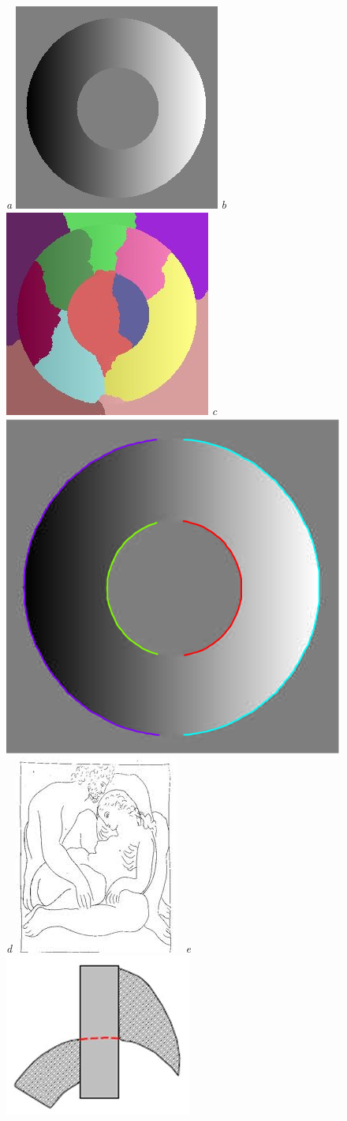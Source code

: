 \begin{figure}[!h]
\centering
{\footnotesize\textit{a}}
\includegraphics[width=0.28\linewidth]{figs/shaded-torus.jpg}
{\footnotesize\textit{b}} \includegraphics[width=0.28\linewidth]{figs/shaded-torus-segmentation.jpg}
{\footnotesize\textit{c}} \includegraphics[width=0.28\linewidth]{figs/torus_contours_multi_color.pdf}
\\
{\footnotesize\textit{d}} \includegraphics[height=0.15\textwidth]{figs/picasso-hands.jpg}
\vbox{
\hbox{
{\footnotesize\textit{e}}
\includegraphics[height=0.15\linewidth]{figs/contour-but-not-region.jpg}
}}
\end{figure}
